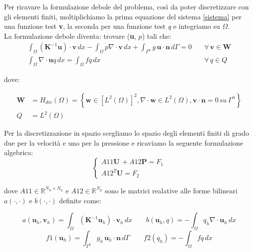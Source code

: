 Per ricavare la formulazione debole del problema, così da poter discretizzare con gli elementi finiti, moltiplichiamo la prima equazione del sistema \ref{sistema} per una funzione test \textbf{v}, la seconda per una funzione test \textit{q} e integriamo su $\Omega$. \\
La formulazione debole diventa: trovare (\textbf{u}, $p$) tali che:
\begin{equation}
\begin{split}
\int_{\Omega} (\textbf{K}^{-1} \textbf{u}) \cdot \textbf{v} \, dx  - \int_{\Omega} p \nabla \cdot \textbf{v} \, dx  + \int_{\Gamma^p} g \, \textbf{u} \cdot \textbf{n} \, d\Gamma = 0 & \quad  \forall \, \textbf{v} \in \textbf{W} \\
\int_{\Omega} \nabla \cdot \textbf{u} q \, dx = \int_{\Omega} f q \, dx & \quad \forall \, q \in Q
\end{split}
\end{equation}\label{formdebole}

dove: 

\begin{equation*}
\begin{split}
\textbf{W} &=H_{div}(\Omega) = \left \{ \textbf{w}\in [L^2(\Omega)]^2, \nabla \cdot \textbf{w} \in L^2(\Omega), \textbf{v} \cdot \textbf{n} = 0 \, su \, \Gamma^n \right \} \\
Q &= L^2(\Omega) 
\end{split}
\end{equation*}

Per la discretizzazione in spazio scegliamo lo spazio degli elementi finiti di grado due per la velocità e uno per la pressione e ricaviamo la seguente formulazione algebrica:
\begin{equation}
\begin{cases}
A11 \textbf{U} \, +A12 \textbf{P} = F_1 \\
A12^T \textbf{U} = F_2
\end{cases}
\end{equation}


dove $ A11 \in \mathbb{R}^{N_u \times N_u}$ e $A12 \in \mathbb{R}^{N_p}$  sono le matrici realative alle forme bilineari $a(\cdot, \cdot)$ e $b(\cdot, \cdot)$ definite come:

$$ a(\textbf{u}_h , \textbf{v}_h)= \int_{\Omega} (\textbf{K}^{-1} \textbf{u}_h) \cdot \textbf{v}_h \, dx \qquad b(\textbf{u}_h, q) = - \int_{\Omega} q_h \nabla \cdot \textbf{u}_h \, dx  $$
$$ f1(\textbf{u}_h) = \int_{\Gamma^p} g_h \, \textbf{u}_h \cdot \textbf{n} \, d\Gamma \qquad f2(q_h) =  - \int_{\Omega} f q \, dx $$

